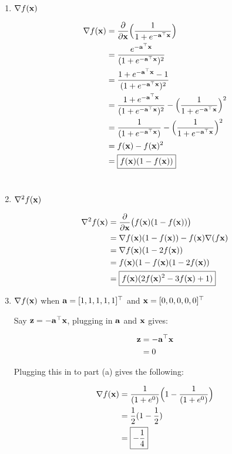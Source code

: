 \documentclass[12pt, fullpage,letterpaper]{article}
\begin{document}
\begin{enumerate}
\begin{enumerate}
\item $\nabla f({\bf x})$

	\[
		\begin{split}
			\nabla f({\bf x}) &= \frac{\partial}{\partial {\bf x}} \Big(\frac{1}{1+ e^{-{\bf a}^\top {\bf x}}}\Big)
				\\
				&= \frac{e^{-{\bf a}^\top {\bf x}}}{(1 + e^{-{\bf a}^\top {\bf x}})^2}
				\\
				&= \frac{1+ e^{-{\bf a}^\top {\bf x}} - 1}{(1 + e^{-{\bf a}^\top {\bf x}})^2}
				\\
				&= \frac{1+ e^{-{\bf a}^\top {\bf x}}}{(1 + e^{-{\bf a}^\top {\bf x}})^2} - \Big(\frac{1}{1 + e^{-{\bf a}^\top {\bf x}}}\Big)^2
				\\
				&= \frac{1}{(1 + e^{-{\bf a}^\top {\bf x}})} - \Big(\frac{1}{1 + e^{-{\bf a}^\top {\bf x}}}\Big)^2
				\\
				&= f({\bf x}) - f({\bf x})^2
				\\
				&= \boxed{f({\bf x})(1-f({\bf x}))}
		\end{split}
	\]
	\\

\item $\nabla^2 f({\bf x})$

	\[
		\begin{split}
			\nabla^2 f({\bf x}) &= \frac{\partial}{\partial {\bf x}} \big(f({\bf x})(1-f({\bf x}))\big)
				\\
				&= \nabla f({\bf x}) (1 - f({\bf x})) - f({\bf x}) \nabla (f{\bf x})
				\\
				&= \nabla f({\bf x}) ( 1 - 2 f({\bf x}))
				\\
				&= f({\bf x})(1-f({\bf x})(1-2f({\bf x}))
				\\
				&= \boxed{f({\bf x})(2f({\bf x})^2 - 3 f({\bf x}) + 1)}
		\end{split}
	\]
	
	
\item $\nabla f({\bf x})$ when ${\bf a} = [1,1,1,1,1]^\top$ and ${\bf x} = [0,0,0,0,0]^\top$

Say ${\bf z} = -{\bf a}^\top{\bf x}$, plugging in ${\bf a}$ and ${\bf x}$ gives:

\[
	\begin{split}
		{\bf z} &= -{\bf a}^\top{\bf x}
			\\
			&= 0
			\\
	\end{split}
\]

Plugging this in to part (a) gives the following:

\[
	\begin{split}
			\nabla f({\bf x}) &= \frac{1}{(1 + e^{0})} \Big(1 - \frac{1}{(1 + e^{0})}\Big)
				\\
				&= \frac{1}{2}(1 - \frac{1}{2})
				\\
				&= \boxed{-\frac{1}{4}}
	\end{split}
\]





\end{enumerate}
\end{enumerate}
\end{document}
